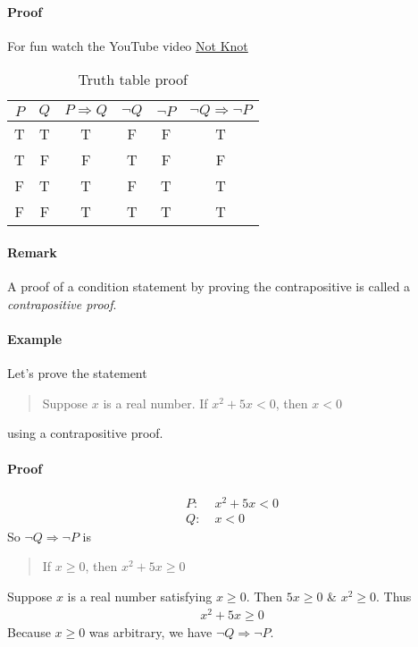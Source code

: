 \documentclass[../main.tex]{subfiles}
\begin{document}
\paragraph{Proof}

For fun watch the YouTube video \href{https://youtu.be/QcLfb0PhfO0?si=ngcYSId-1LFhW5fA}{Not Knot}

\begin{table*}[h]
    \centering
    \begin{tabular}{c|c|c|c|c|c}
        $P$ & $Q$ & $P \Rightarrow Q$ & $\neg Q$ & $\neg P$ & $\neg Q \Rightarrow \neg P$ \\
        \hline
        T & T & T & F & F & T \\
        T & F & F & T & F & F \\
        F & T & T & F & T & T \\
        F & F & T & T & T & T
    \end{tabular}
    \caption{Truth table proof}
\end{table*}

\paragraph{Remark} 

A proof of a condition statement by proving the contrapositive is called a \emph{contrapositive proof}.

\paragraph{Example}

Let's prove the statement
\begin{quote}
    Suppose $x$ is a real number. If $x^2 + 5x < 0$, then $x <0$
\end{quote}
using a contrapositive proof.

\paragraph{Proof}

\begin{align*}
    P:& \; x^2 + 5x < 0 \\
    Q:& \; x < 0
\end{align*}
So $\neg Q \Rightarrow \neg P$ is
\begin{quote}
    If $x \geq 0$, then $x^2 + 5x \geq 0$
\end{quote}
Suppose $x$ is a real number satisfying $x \geq 0$. Then $5x \geq 0$ \& $x^2 \geq 0$. Thus
\begin{align*}
    x^2 + 5x \geq 0
\end{align*}
Because $x \geq 0$ was arbitrary, we have $\neg Q \Rightarrow \neg P$.
\end{document}
